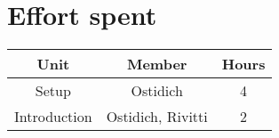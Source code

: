 \chapter{Effort spent}

\begin{table}[h]
    \centering
    \begin{tabular}{|c|c|c|}
        \hline \textbf{Unit} & \textbf{Member} & \textbf{Hours} \\
        \hline Setup & Ostidich & 4 \\
        \hline Introduction & Ostidich, Rivitti & 2 \\
        \hline
    \end{tabular}\label{tab:effort-table}
\end{table}

